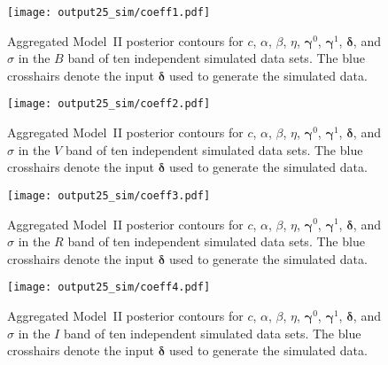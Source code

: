 \documentclass{aastex61}   	%
\begin{document}
\begin{figure}[htbp] %
   \centering
   \texttt{[image: output25\_sim/coeff1.pdf]} 
            \caption{Aggregated Model~II posterior contours for $c$, $\alpha$, $\beta$, $\eta$, $\pmb{\gamma}^0$, $\pmb{\gamma}^1$,  $\pmb{\delta}$, and $\sigma$ in the $B$ band of ten independent simulated data sets.  The blue crosshairs denote the input $\pmb{\delta}$ used to generate the simulated data.
 \label{simglobal2:fig}}
\end{figure}

\begin{figure}[htbp] %
   \centering
   \texttt{[image: output25\_sim/coeff2.pdf]} 
            \caption{Aggregated Model~II posterior contours for $c$, $\alpha$, $\beta$, $\eta$, $\pmb{\gamma}^0$, $\pmb{\gamma}^1$,  $\pmb{\delta}$, and $\sigma$ in the $V$ band of ten independent simulated data sets.   The blue crosshairs denote the input $\pmb{\delta}$ used to generate the simulated data. \label{simglobal3:fig}}
\end{figure}

\begin{figure}[htbp] %
   \centering
      \texttt{[image: output25\_sim/coeff3.pdf]} 
            \caption{Aggregated Model~II posterior contours for $c$, $\alpha$, $\beta$, $\eta$, $\pmb{\gamma}^0$, $\pmb{\gamma}^1$,  $\pmb{\delta}$, and $\sigma$ in the $R$ band of ten independent simulated data sets.   The blue crosshairs denote the input $\pmb{\delta}$ used to generate the simulated data.
\label{simglobal4:fig}}
\end{figure}

\begin{figure}[htbp] %
   \centering
         \texttt{[image: output25\_sim/coeff4.pdf]} 
            \caption{Aggregated Model~II posterior contours for $c$, $\alpha$, $\beta$, $\eta$, $\pmb{\gamma}^0$, $\pmb{\gamma}^1$,  $\pmb{\delta}$, and $\sigma$ in the $I$ band of ten independent simulated data sets.  The blue crosshairs denote the input $\pmb{\delta}$ used to generate the simulated data.
 \label{simglobal5:fig}}
\end{figure}
\end{document}
